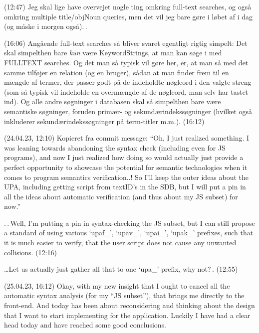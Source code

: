 \documentclass{report}
\begin{document}
(12:47) Jeg skal lige have overvejet nogle ting omkring full-text searches, og også omkring multiple title/objNoun queries, men det vil jeg bare gøre i løbet af i dag (og måske i morgen også).\,. 


(16:06) Angående full-text searches så bliver svaret egentligt rigtig simpelt: Det skal simpelthen bare \emph{kun} være KeywordStrings, at man kan søge i med FULLTEXT searches. Og det man så typisk vil gøre her, er, at man så med det samme tilføjer en relation (og en bruger), sådan at man finder frem til en mængde af termer, der passer godt på de indeholdte nøgleord i den valgte streng (som så typisk vil indeholde en overmængde af de nøgleord, man selv har tastet ind). Og alle andre søgninger i databasen skal så simpelthen bare være semantiske søgninger, foruden primær- og sekundærindekssøgninger (hvilket også inkluderer sekundærindekssøgninger på term-titler m.m.). (16:12)


(24.04.23, 12:10) Kopieret fra commit message: ``Oh, I just realized something. I was leaning towards abandoning the syntax check (including even for JS programs), and now I just realized how doing so would actually just provide a perfect opportunity to showcase the potential for semantic technologies when it comes to program semantics verification..! So I'll keep the outer ideas about the UPA, including getting script from textID's in the SDB, but I will put a pin in all the ideas about automatic verification (and thus about my JS subset) for now.''

.\,.\,Well, I'm putting a pin in syntax-checking the JS subset, but I can still propose a standard of using various `upaf\_', `upav\_', `upai\_', `upak\_' prefixes, such that it is much easier to verify, that the user script does not cause any unwanted collisions. (12:16)

\ldots Let us actually just gather all that to one `upa\_' prefix, why not?\,. (12:55)

(25.04.23, 16:12) Okay, with my new insight that I ought to cancel all the automatic syntax analysis (for my ``JS subset''), that brings me directly to the front-end. And today has been about reconsidering and thinking about the design that I want to start implementing for the application. Luckily I have had a clear head today and have reached some good conclusions.
\end{document}

